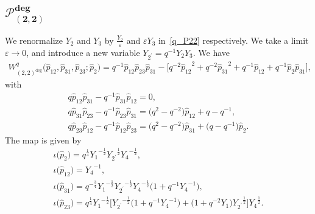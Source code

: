\documentclass[10pt,a4paper]{amsart}
\numberwithin{equation}{section}
\begin{document}
\subsection[$\mathcal{P}_{(2,2)}^{\text{deg}}$]{$\boldsymbol{\mathcal{P}_{(2,2)}^{\text{deg}}}$}
We renormalize $Y_2$ and $Y_3$ by $\frac{Y_2}{\varepsilon}$ and $\varepsilon Y_3$ in~\eqref{q_P22} respectively. We take a limit $\varepsilon \to 0$, and introduce a new variable $Y_{2^\prime} = q^{-1} Y_2 Y_3$. We have
\begin{gather*}
 W^q_{(2,2)^{\text{deg}}}\big ( \hat{p}_{12}, \hat{p}_{31}, \hat{p}_{23}; \hat{p}_2 \big) = q^{-1} \hat{p}_{12} \hat{p}_{23} \hat{p}_{31} - \big[ q^{-2} {\hat{p}_{12}}^{2} +q^{-2} {\hat{p}_{31}}^{2} + q^{-1} \hat{p}_{12} + q^{-1} \hat{p}_2 \hat{p}_{31}\big] ,
\end{gather*}
with
\begin{gather*}
q \hat{p}_{12} \hat{p}_{31} - q^{-1} \hat{p}_{31} \hat{p}_{12} =0 , \\
q \hat{p}_{31} \hat{p}_{23} - q^{-1} \hat{p}_{23} \hat{p}_{31} = \big(q^2 - q^{-2}\big) \hat{p}_{12} + q-q^{-1} , \\
q \hat{p}_{23} \hat{p}_{12} - q^{-1} \hat{p}_{12} \hat{p}_{23} = \big(q^2 - q^{-2}\big) \hat{p}_{31} + \big(q-q^{-1}\big) \hat{p}_2 .
\end{gather*}
The map is given by
\begin{gather*}
\iota\big(\hat{p}_2\big) = q^{\frac{1}{4}} {Y_1}^{-\frac{1}{2}} {Y_{2^\prime}}^{\frac{1}{2}} {Y_4}^{-\frac{1}{2} } , \\
\iota\big(\hat{p}_{12}\big) = {Y_4}^{-1} , \\
\iota\big(\hat{p}_{31}\big) = q^{-\frac{3}{4}} {Y_1}^{-\frac{1}{2}} {Y_{2^\prime}}^{-\frac{1}{2}} {Y_4}^{-\frac{1}{2}}\big( 1 + q^{-1} {Y_4}^{-1}\big) , \\
\iota\big(\hat{p}_{23}\big) = q^{\frac{1}{4}} {Y_1}^{-\frac{1}{2}} \big[ {Y_{2^\prime}}^{-\frac{1}{2}} \big( 1 + q^{-1} {Y_4}^{-1}\big) + \big( 1+q^{-2} Y_1\big) {Y_{2^\prime}}^{\frac{1}{2}}\big] {Y_4}^{\frac{1}{2}} .
\end{gather*}
\end{document}
